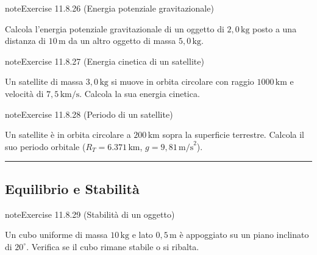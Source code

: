 \documentclass[letterpaper,10pt,italian]{jupyterBook}
\begin{document}
\begin{sphinxadmonition}{note}{Exercise 11.8.26 (Energia potenziale gravitazionale)}



\sphinxAtStartPar
Calcola l’energia potenziale gravitazionale di un oggetto di \(2,0 \, \text{kg}\) posto a una distanza di \(10 \, \text{m}\) da un altro oggetto di massa \(5,0 \, \text{kg}\).
\end{sphinxadmonition}
 \label{exercise:ch/mechanics/dynamics-problems-exercise-26}

\begin{sphinxadmonition}{note}{Exercise 11.8.27 (Energia cinetica di un satellite)}



\sphinxAtStartPar
Un satellite di massa \(3,0 \, \text{kg}\) si muove in orbita circolare con raggio \(1000 \, \text{km}\) e velocità di \(7,5 \, \text{km/s}\). Calcola la sua energia cinetica.
\end{sphinxadmonition}
 \label{exercise:ch/mechanics/dynamics-problems-exercise-27}

\begin{sphinxadmonition}{note}{Exercise 11.8.28 (Periodo di un satellite)}



\sphinxAtStartPar
Un satellite è in orbita circolare a \(200 \, \text{km}\) sopra la superficie terrestre. Calcola il suo periodo orbitale (\(R_T = 6.371 \, \text{km}\), \(g = 9,81 \, \text{m/s}^2\)).
\end{sphinxadmonition}


\bigskip\hrule\bigskip



\subsection{Equilibrio e Stabilità}
\label{\detokenize{ch/mechanics/dynamics-problems:equilibrio-e-stabilita}} \label{exercise:ch/mechanics/dynamics-problems-exercise-28}

\begin{sphinxadmonition}{note}{Exercise 11.8.29 (Stabilità di un oggetto)}



\sphinxAtStartPar
Un cubo uniforme di massa \(10 \, \text{kg}\) e lato \(0,5 \, \text{m}\) è appoggiato su un piano inclinato di \(20^\circ\). Verifica se il cubo rimane stabile o si ribalta.
\end{sphinxadmonition}
 \label{exercise:ch/mechanics/dynamics-problems-exercise-29}
\end{document}
